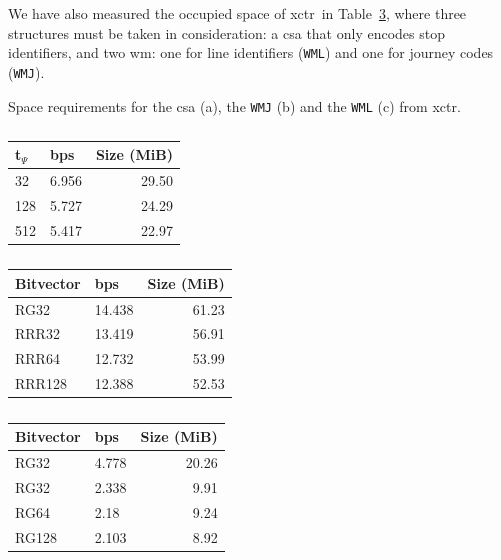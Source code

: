     We have also measured the occupied space of \gls{xctr}~in Table~\ref{tab:ctr}, where three structures must be taken in consideration: a \gls{csa} that only encodes stop identifiers, and two \gls{wm}: one for line identifiers (\texttt{WML}) and one for journey codes (\texttt{WMJ}).
    
    \begin{table}[ht]
        \caption{Space requirements for the \acrlong{csa} (a), the \texttt{WMJ} (b) and the \texttt{WML} (c) from \acrshort{xctr}.}
        \label{tab:ctr}
        \begin{subtable}[t]{.35\linewidth}
        \vspace{-12pt}
        \caption{}
        \begin{tabular}[t]{|l|l|r|}
            \hline
            t$_\Psi$ & bps & Size (MiB) \\
             \hline
            32 & 6.956 & 29.50 \\
            128 & 5.727 & 24.29 \\
            512 & 5.417 & 22.97 \\
            \hline
        \end{tabular}
        \end{subtable}
        \begin{subtable}[t]{.5\linewidth}
        \vspace{-12pt}
        \caption{}
        \begin{tabular}[t]{|l|l|r|}
            \hline
            Bitvector & bps & Size (MiB) \\
             \hline
            RG32 & 14.438 & 61.23 \\
            RRR32 & 13.419 & 56.91 \\
            RRR64 & 12.732 & 53.99 \\
            RRR128 & 12.388 & 52.53 \\
            \hline
        \end{tabular}
        \end{subtable}
        \begin{subtable}[t]{.4\linewidth}
        \vspace{-12pt}
        \caption{}
        \begin{tabular}[t]{|l|l|r|}
            \hline
            Bitvector & bps & Size (MiB) \\
             \hline
            RG32 & 4.778 & 20.26 \\
            RG32 & 2.338 & 9.91 \\
            RG64 & 2.18 & 9.24 \\
            RG128 & 2.103 & 8.92 \\
            \hline
        \end{tabular}
        \end{subtable}%
    \end{table}
    
